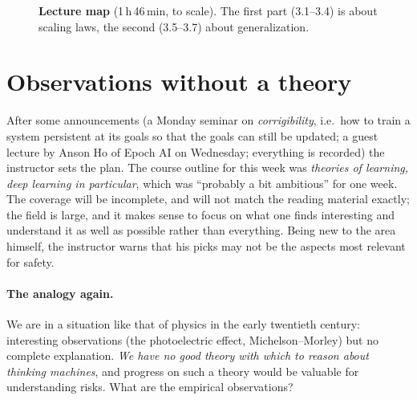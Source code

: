 \begin{figure}[tb]
\centering
{}
\caption{\textbf{Lecture map} (1\,h\,46\,min, to scale). The first part (3.1--3.4) is about scaling laws, the second (3.5--3.7) about generalization.}
\end{figure}

\section{Observations without a theory}\label{sec:L3-observations}
After some announcements (a Monday seminar on \emph{corrigibility}, i.e.\ how to train a system persistent at its goals so that the goals can still be updated; a guest lecture by Anson Ho of Epoch AI on Wednesday; everything is recorded) the instructor sets the plan.
The course outline for this week was \emph{theories of learning, deep learning in particular}, which was ``probably a bit ambitious'' for one week. The coverage will be incomplete, and will not match the reading material exactly; the field is large, and it makes sense to focus on what one finds interesting and understand it as well as possible rather than everything.
Being new to the area himself, the instructor warns that his picks may not be the aspects most relevant for safety.

\paragraph{The analogy again.}
We are in a situation like that of physics in the early twentieth century: interesting observations (the photoelectric effect, Michelson--Morley) but no complete explanation. \emph{We have no good theory with which to reason about thinking machines}, and progress on such a theory would be valuable for understanding risks.
What are the empirical observations?

